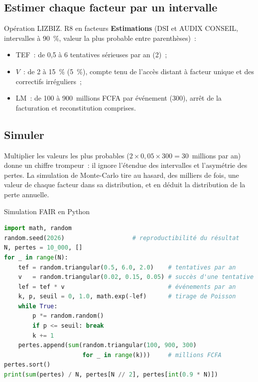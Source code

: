 \subsection{Estimer chaque facteur par un intervalle}

\begin{boxscenario}{Opération LIZBIZ. R8 en facteurs}
\textbf{Estimations} (DSI et AUDIX CONSEIL, intervalles à 90~\%, valeur la
plus probable entre parenthèses)~:
\begin{itemize}
    \item TEF~: de 0,5 à 6 tentatives sérieuses par an (2)~;
    \item $V$~: de 2 à 15~\% (5~\%), compte tenu de l'accès distant à
          facteur unique et des correctifs irréguliers~;
    \item LM~: de 100 à 900~millions FCFA par événement (300), arrêt de la
          facturation et reconstitution comprises.
\end{itemize}
\end{boxscenario}

\subsection{Simuler}

Multiplier les valeurs les plus probables ($2 \times 0{,}05 \times 300 =
30$~millions par an) donne un chiffre trompeur~: il ignore l'étendue des
intervalles et l'asymétrie des pertes. La simulation de Monte-Carlo tire
au hasard, des milliers de fois, une valeur de chaque facteur dans sa
distribution, et en déduit la distribution de la perte annuelle.

\begin{boxoutils}{Simulation FAIR en Python}
\begin{lstlisting}[language=Python]
import math, random
random.seed(2026)                   # reproductibilité du résultat
N, pertes = 10_000, []
for _ in range(N):
    tef = random.triangular(0.5, 6.0, 2.0)    # tentatives par an
    v   = random.triangular(0.02, 0.15, 0.05) # succès d'une tentative
    lef = tef * v                             # événements par an
    k, p, seuil = 0, 1.0, math.exp(-lef)      # tirage de Poisson
    while True:
        p *= random.random()
        if p <= seuil: break
        k += 1
    pertes.append(sum(random.triangular(100, 900, 300)
                      for _ in range(k)))     # millions FCFA
pertes.sort()
print(sum(pertes) / N, pertes[N // 2], pertes[int(0.9 * N)])
\end{lstlisting}
\end{boxoutils}

